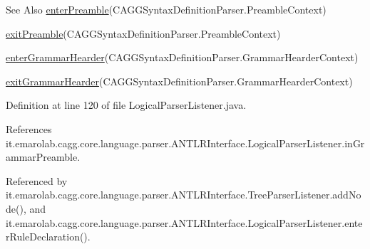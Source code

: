 \begin{DoxySeeAlso}{See Also}
\hyperlink{classit_1_1emarolab_1_1cagg_1_1core_1_1language_1_1parser_1_1ANTLRInterface_1_1LogicalParserListener_a6c2f37e90c25bcfd418df3b5e9f64eb2}{enter\-Preamble}(C\-A\-G\-G\-Syntax\-Definition\-Parser.\-Preamble\-Context) 

\hyperlink{classit_1_1emarolab_1_1cagg_1_1core_1_1language_1_1parser_1_1ANTLRInterface_1_1LogicalParserListener_a7c71fdd55848e72a3896cc5590c00970}{exit\-Preamble}(C\-A\-G\-G\-Syntax\-Definition\-Parser.\-Preamble\-Context) 

\hyperlink{classit_1_1emarolab_1_1cagg_1_1core_1_1language_1_1parser_1_1ANTLRInterface_1_1LogicalParserListener_a5ed55a36fc6f77b3d455c08f1ef6a36f}{enter\-Grammar\-Hearder}(C\-A\-G\-G\-Syntax\-Definition\-Parser.\-Grammar\-Hearder\-Context) 

\hyperlink{classit_1_1emarolab_1_1cagg_1_1core_1_1language_1_1parser_1_1ANTLRInterface_1_1LogicalParserListener_a136894e821f25bd8b9bc78f65cd3a6cd}{exit\-Grammar\-Hearder}(C\-A\-G\-G\-Syntax\-Definition\-Parser.\-Grammar\-Hearder\-Context) 
\end{DoxySeeAlso}


Definition at line 120 of file Logical\-Parser\-Listener.\-java.



References it.\-emarolab.\-cagg.\-core.\-language.\-parser.\-A\-N\-T\-L\-R\-Interface.\-Logical\-Parser\-Listener.\-in\-Grammar\-Preamble.



Referenced by it.\-emarolab.\-cagg.\-core.\-language.\-parser.\-A\-N\-T\-L\-R\-Interface.\-Tree\-Parser\-Listener.\-add\-Node(), and it.\-emarolab.\-cagg.\-core.\-language.\-parser.\-A\-N\-T\-L\-R\-Interface.\-Logical\-Parser\-Listener.\-enter\-Rule\-Declaration().

